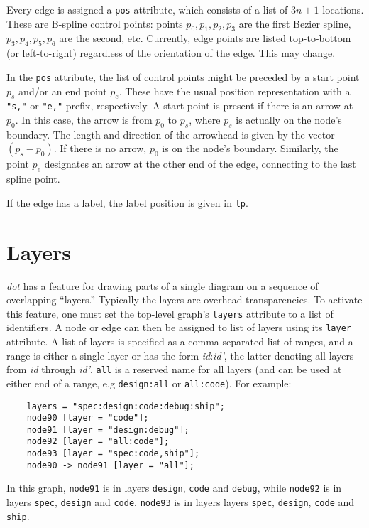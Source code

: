 \documentclass[11pt]{article}
\def\dot{{\it dot}}
\begin{document}
{Every edge is assigned a {\tt pos} attribute, which consists of
a list of $3n + 1$ locations. These are B-spline control points:
points $p_0, p_1, p_2, p_3$ are the first Bezier spline,
$p_3, p_4, p_5, p_6$ are the second, etc.
Currently, edge points are listed top-to-bottom (or left-to-right)
regardless of the orientation of the edge. This may change.

In the {\tt pos} attribute, the list of control points might
be preceded by a start point $p_s$ and/or an end point $p_e$. These have the
usual position representation with a {\tt "s,"} or {\tt "e,"}
prefix, respectively. A start point is present if there is an 
arrow at $p_0$.
In this case, the arrow is from $p_0$ to $p_s$, where
$p_s$ is actually on the node's boundary. The length and direction
of the arrowhead
is given by the vector $(p_s - p_0)$.
If there is no arrow, $p_0$ is on the node's boundary.
Similarly, the point $p_e$ designates an arrow at the other end of the
edge, connecting to the last spline point.

If the edge has a label, the label position is given in {\tt lp}. 

\clearpage
\section{Layers}
{\dot} has a feature for drawing parts of a single diagram on
a sequence of overlapping ``layers.'' Typically the layers are
overhead transparencies.  To activate this feature, one must
set the top-level graph's {\tt layers} attribute to a list of identifiers.
A node or edge can then be assigned to list of layers
using its {\tt layer} attribute.
A list of layers is specified as a comma-separated list of ranges, and
a range is either a single layer or has the form {\em id}:{\em id'}, the latter
denoting all layers from {\em id} through {\em id'}.
{\tt all} is a reserved name for all layers (and can be
used at either end of a range, e.g {\tt design:all} or {\tt all:code}).
For example:
\begin{verbatim}
    layers = "spec:design:code:debug:ship";
    node90 [layer = "code"];
    node91 [layer = "design:debug"]; 
    node92 [layer = "all:code"];
    node93 [layer = "spec:code,ship"];
    node90 -> node91 [layer = "all"];
\end{verbatim}
In this graph, {\tt node91} is in layers {\tt design}, {\tt code}
and {\tt debug}, while {\tt node92} is in layers {\tt spec},
{\tt design} and {\tt code}. {\tt node93} is in layers
layers {\tt spec}, {\tt design}, {\tt code} and {\tt ship}.

}
\end{document}
